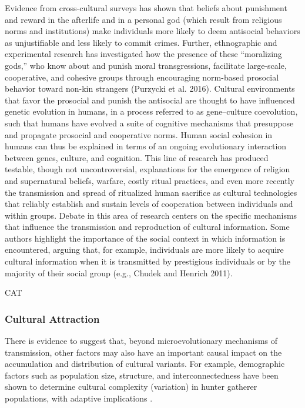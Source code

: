 Evidence from cross-cultural surveys has shown that beliefs about punishment and reward in the afterlife and in a personal god (which result from religious norms and institutions) make individuals more likely to deem antisocial behaviors as unjustifiable and less likely to commit crimes. Further, ethnographic and experimental research has investigated how the presence of these “moralizing gods,” who know about and punish moral transgressions, facilitate large-scale, cooperative, and cohesive groups through encouraging norm-based prosocial behavior toward non-kin strangers (Purzycki et al. 2016). Cultural environments that favor the prosocial and punish the antisocial are thought to have influenced genetic evolution in humans, in a process referred to as gene–culture coevolution, such that humans have evolved a suite of cognitive mechanisms that presuppose and propagate prosocial and cooperative norms.
Human social cohesion in humans can thus be explained in terms of an ongoing evolutionary interaction between genes, culture, and cognition. This line of research has produced testable, though not uncontroversial, explanations for the emergence of religion and supernatural beliefs, warfare, costly ritual practices, and even more recently the transmission and spread of ritualized human sacrifice as cultural technologies that reliably establish and sustain levels of cooperation between individuals and within groups. Debate in this area of research centers on the specific mechanisms that influence the transmission and reproduction of cultural information. Some authors highlight the importance of the social context in which information is encountered, arguing that, for example, individuals are more likely to acquire cultural information when it is transmitted by prestigious individuals or by the majority of their social group (e.g., Chudek and Henrich 2011).





CAT

\subsubsection{Cultural Attraction}
There is evidence to suggest that, beyond microevolutionary mechanisms of transmission, other factors may also have an important causal impact on the accumulation and distribution of cultural variants. For example, demographic factors such as population size, structure, and interconnectedness have been shown to determine cultural complexity (variation) in hunter gatherer populations, with adaptive implications \citep{Henrich2004}.

